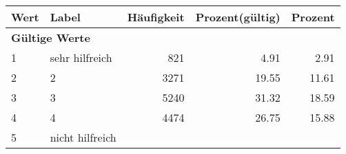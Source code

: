      \begin{longtable}{lXrrr}
     \toprule
     \textbf{Wert} & \textbf{Label} & \textbf{Häufigkeit} & \textbf{Prozent(gültig)} & \textbf{Prozent} \\
     \endhead
     \midrule
     \multicolumn{5}{l}{\textbf{Gültige Werte}}\\

     1 &
     \multicolumn{1}{X}{ sehr hilfreich   } &


       \num{821} &
       \num[round-mode=places,round-precision=2]{4,91} &
         \num[round-mode=places,round-precision=2]{2,91} \\

     2 &
     \multicolumn{1}{X}{ 2   } &


       \num{3271} &
       \num[round-mode=places,round-precision=2]{19,55} &
         \num[round-mode=places,round-precision=2]{11,61} \\

     3 &
     \multicolumn{1}{X}{ 3   } &


       \num{5240} &
       \num[round-mode=places,round-precision=2]{31,32} &
         \num[round-mode=places,round-precision=2]{18,59} \\

     4 &
     \multicolumn{1}{X}{ 4   } &


       \num{4474} &
       \num[round-mode=places,round-precision=2]{26,75} &
         \num[round-mode=places,round-precision=2]{15,88} \\

     5 &
     \multicolumn{1}{X}{ nicht hilfreich   } &



\end{longtable}
